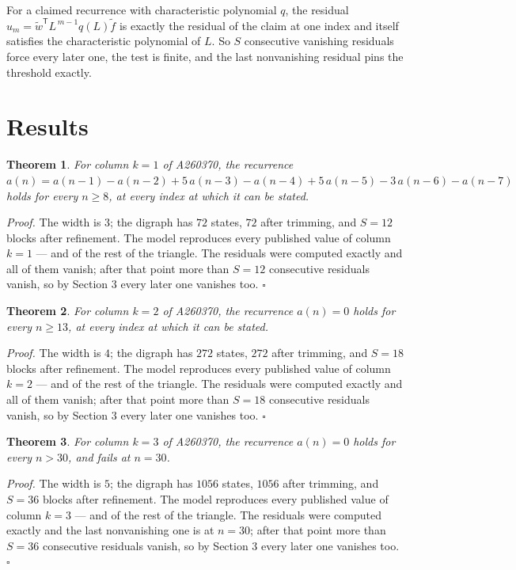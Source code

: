 \documentclass[11pt]{article}
\newtheorem{theorem}{Theorem}
\theoremstyle{definition}
\begin{document}
For a claimed recurrence with characteristic polynomial $q$, the residual $u_m = \tilde w^{\mathsf T}L^{\,m-1}q(L)\tilde f$ is exactly the residual of the claim at one index and itself satisfies the characteristic polynomial of $L$. So $S$ consecutive vanishing residuals force every later one, the test is finite, and the last nonvanishing residual pins the threshold exactly.

\section{Results}

\begin{theorem} For column $k = 1$ of A260370, the recurrence $a(n) = a(n-1) - a(n-2) + 5\,a(n-3) - a(n-4) + 5\,a(n-5) - 3\,a(n-6) - a(n-7)$ holds for every $n \ge 8$, at every index at which it can be stated.\end{theorem}

{\itshape Proof.} The width is $3$; the digraph has $72$ states, $72$ after trimming, and $S = 12$ blocks after refinement. The model reproduces every published value of column $k = 1$ --- and of the rest of the triangle. The residuals were computed exactly and all of them vanish; after that point more than $S = 12$ consecutive residuals vanish, so by Section 3 every later one vanishes too. $\square$

\begin{theorem} For column $k = 2$ of A260370, the recurrence $a(n) = 0$ holds for every $n \ge 13$, at every index at which it can be stated.\end{theorem}

{\itshape Proof.} The width is $4$; the digraph has $272$ states, $272$ after trimming, and $S = 18$ blocks after refinement. The model reproduces every published value of column $k = 2$ --- and of the rest of the triangle. The residuals were computed exactly and all of them vanish; after that point more than $S = 18$ consecutive residuals vanish, so by Section 3 every later one vanishes too. $\square$

\begin{theorem} For column $k = 3$ of A260370, the recurrence $a(n) = 0$ holds for every $n > 30$, and fails at $n = 30$.\end{theorem}

{\itshape Proof.} The width is $5$; the digraph has $1056$ states, $1056$ after trimming, and $S = 36$ blocks after refinement. The model reproduces every published value of column $k = 3$ --- and of the rest of the triangle. The residuals were computed exactly and the last nonvanishing one is at $n = 30$; after that point more than $S = 36$ consecutive residuals vanish, so by Section 3 every later one vanishes too. $\square$
\end{document}
